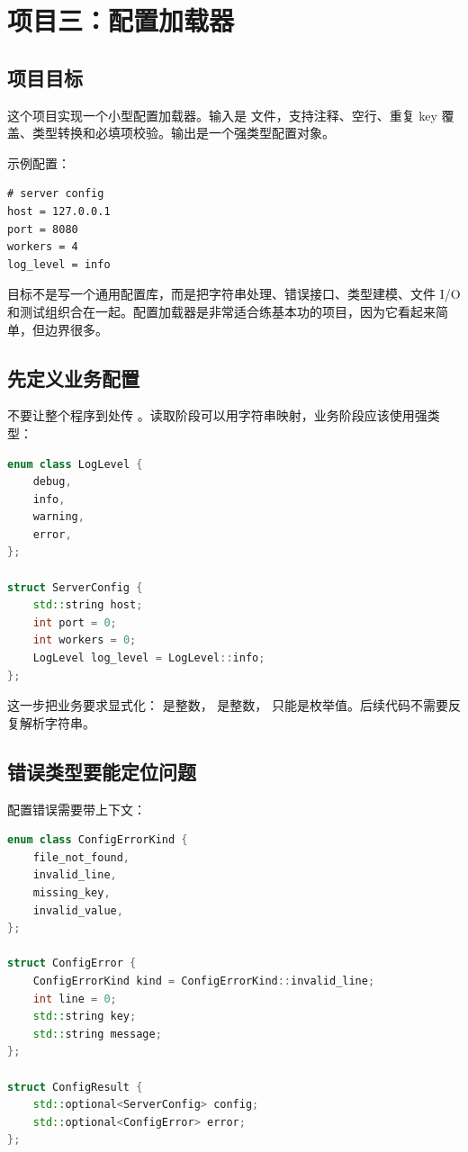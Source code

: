 \chapter{项目三：配置加载器}

\section{项目目标}

这个项目实现一个小型配置加载器。输入是  文件，支持注释、空行、重复 key 覆盖、类型转换和必填项校验。输出是一个强类型配置对象。

示例配置：

\begin{lstlisting}[caption={配置文件示例}]
# server config
host = 127.0.0.1
port = 8080
workers = 4
log_level = info
\end{lstlisting}

目标不是写一个通用配置库，而是把字符串处理、错误接口、类型建模、文件 I/O 和测试组织合在一起。配置加载器是非常适合练基本功的项目，因为它看起来简单，但边界很多。

\section{先定义业务配置}

不要让整个程序到处传 。读取阶段可以用字符串映射，业务阶段应该使用强类型：

\begin{lstlisting}[language=C++,caption={强类型服务器配置}]
enum class LogLevel {
    debug,
    info,
    warning,
    error,
};

struct ServerConfig {
    std::string host;
    int port = 0;
    int workers = 0;
    LogLevel log_level = LogLevel::info;
};
\end{lstlisting}

这一步把业务要求显式化： 是整数， 是整数， 只能是枚举值。后续代码不需要反复解析字符串。

\section{错误类型要能定位问题}

配置错误需要带上下文：

\begin{lstlisting}[language=C++,caption={配置错误}]
enum class ConfigErrorKind {
    file_not_found,
    invalid_line,
    missing_key,
    invalid_value,
};

struct ConfigError {
    ConfigErrorKind kind = ConfigErrorKind::invalid_line;
    int line = 0;
    std::string key;
    std::string message;
};

struct ConfigResult {
    std::optional<ServerConfig> config;
    std::optional<ConfigError> error;
};
\end{lstlisting}

